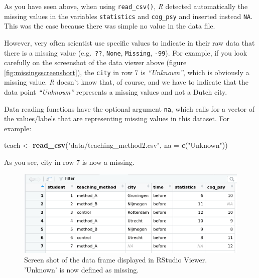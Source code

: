 \documentclass[
]{scrartcl}
\newenvironment{Shaded}{\begin{snugshade}}{\end{snugshade}}
\newcommand{\AttributeTok}[1]{\textcolor[rgb]{0.13,0.29,0.53}{#1}}
\newcommand{\FunctionTok}[1]{\textcolor[rgb]{0.13,0.29,0.53}{\textbf{#1}}}
\newcommand{\NormalTok}[1]{#1}
\newcommand{\OtherTok}[1]{\textcolor[rgb]{0.56,0.35,0.01}{#1}}
\newcommand{\StringTok}[1]{\textcolor[rgb]{0.31,0.60,0.02}{#1}}
\begin{document}
As you have seen above, when using \texttt{read\_csv()}, \emph{R} detected automatically the missing values in the variables \texttt{statistics} and \texttt{cog\_psy} and inserted instead \texttt{NA}. This was the case because there was simple no value in the data file.

However, very often scientist use specific values to indicate in their raw data that there is a missing value (e.g.~\texttt{??}, \texttt{None}, \texttt{Missing}, \texttt{-99}). For example, if you look carefully on the screenshot of the data viewer above (figure \ref{fig:missingsscreenshort}), the \texttt{city} in row 7 is \emph{``Unknown''}, which is obviously a missing value. \emph{R} doesn't know that, of course, and we have to indicate that the data point \emph{``Unknown''} represents a missing values and not a Dutch city.

Data reading functions have the optional argument \texttt{na}, which calls for a vector of the values/labels that are representing missing values in this dataset. For example:

\begin{Shaded}
\begin{Highlighting}[]
\NormalTok{teach }\OtherTok{\textless{}{-}} \FunctionTok{read\_csv}\NormalTok{(}\StringTok{"data/teaching\_method2.csv"}\NormalTok{, }\AttributeTok{na =} \FunctionTok{c}\NormalTok{(}\StringTok{"Unknown"}\NormalTok{))}
\end{Highlighting}
\end{Shaded}

As you see, city in row 7 is now a missing.

\begin{figure}

{\centering \includegraphics[width=500px]{images/missings} 

}

\caption{Screen shot of the data frame displayed in RStudio Viewer. 'Unknown' is now defined as missing.}\label{fig:unnamed-chunk-210}
\end{figure}
\end{document}
